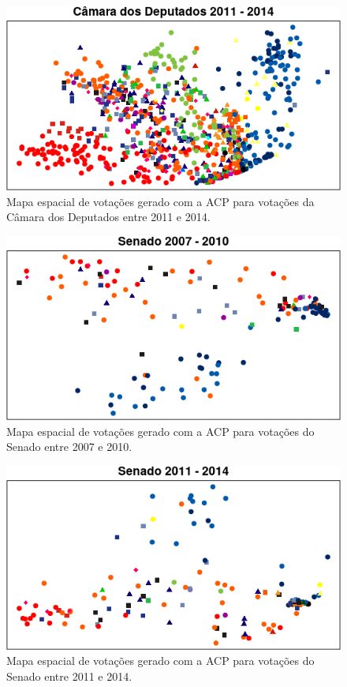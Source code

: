 \documentclass[a4paper, 12pt]{article}
\begin{document}
\begin{figure}[h!]
  \centering
  \includegraphics[scale=0.9]{figs/cdep2011-2014.png}
  \caption{Mapa espacial de votações gerado com a ACP para votações da Câmara dos Deputados entre 2011 e 2014.}
  \label{fig:cdep2011-2014}
\end{figure}

\begin{figure}[h!]
  \centering
  \includegraphics[scale=0.9]{figs/sen2007-2010.png}
  \caption{Mapa espacial de votações gerado com a ACP para votações do Senado entre 2007 e 2010.}
  \label{fig:sen2007-2010}
\end{figure}

\begin{figure}[h!]
  \centering
  \includegraphics[scale=0.9]{figs/sen2011-2014.png}
  \caption{Mapa espacial de votações gerado com a ACP para votações do Senado entre 2011 e 2014.}
  \label{fig:sen2011-2014}
\end{figure}
\end{document}
